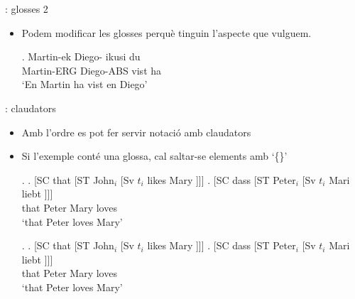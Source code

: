 \begin{frame}[fragile]{\insertsubsection{}: glosses 2}
\begin{itemize}
\item Podem modificar les glosses perquè tinguin l'aspecte que vulguem.
\begin{exampletwouptiny}
\renewcommand{\eachwordone}{\itshape}
\renewcommand{\eachwordtwo}{\tiny}

\exg. 
Martin-ek Diego-\zero{} ikusi du \\
Martin-ERG Diego-ABS vist ha \\
\glt `En Martin ha vist en Diego'


\end{exampletwouptiny}
\end{itemize}

\end{frame}

\begin{frame}[fragile]{\insertsubsection{}: claudators}
\begin{itemize}
\item Amb l'ordre  es pot fer servir notació amb claudators
\item Si l'exemple conté una glossa, cal saltar-se elements amb `\{\}'
\begin{MyMinted}
\exi.
\a.  [SC that [ST John$_i$  [Sv $t_i$ likes Mary ]]]
\bg. [SC dass [ST Peter$_i$ [Sv $t_i$ Mari liebt ]]] \\
{} that {} Peter {} {} Mary loves \\
\glt `that Peter loves Mary'
\end{MyMinted}
\exi.
\a.  [SC that [ST John$_i$  [Sv $t_i$ likes Mary ]]]
\bg. [SC dass [ST Peter$_i$ [Sv $t_i$ Mari liebt ]]] \\
{} that {} Peter {} {} Mary loves \\
\glt `that Peter loves Mary'

\end{itemize}

\end{frame}

